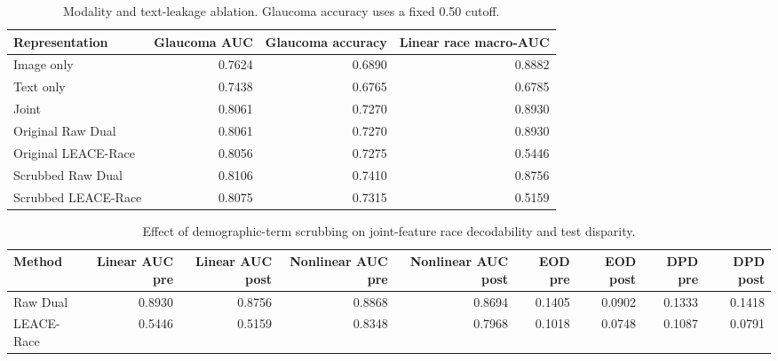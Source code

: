 \begin{table}[htbp]
\centering
\small
\caption{Modality and text-leakage ablation. Glaucoma accuracy uses a fixed 0.50 cutoff.}
\label{tab:text-modality-ablation}
\begin{tabular}{lrrr}
\toprule
Representation & Glaucoma AUC & Glaucoma accuracy & Linear race macro-AUC \\
\midrule
Image only & 0.7624 & 0.6890 & 0.8882 \\
Text only & 0.7438 & 0.6765 & 0.6785 \\
Joint & 0.8061 & 0.7270 & 0.8930 \\
Original Raw Dual & 0.8061 & 0.7270 & 0.8930 \\
Original LEACE-Race & 0.8056 & 0.7275 & 0.5446 \\
Scrubbed Raw Dual & 0.8106 & 0.7410 & 0.8756 \\
Scrubbed LEACE-Race & 0.8075 & 0.7315 & 0.5159 \\
\bottomrule
\end{tabular}
\end{table}

\begin{table}[htbp]
\centering
\small
\caption{Effect of demographic-term scrubbing on joint-feature race decodability and test disparity.}
\label{tab:text-scrubbing-effect}
\begin{tabular}{lrrrrrrrr}
\toprule
Method & Linear AUC pre & Linear AUC post & Nonlinear AUC pre & Nonlinear AUC post & EOD pre & EOD post & DPD pre & DPD post \\
\midrule
Raw Dual & 0.8930 & 0.8756 & 0.8868 & 0.8694 & 0.1405 & 0.0902 & 0.1333 & 0.1418 \\
LEACE-Race & 0.5446 & 0.5159 & 0.8348 & 0.7968 & 0.1018 & 0.0748 & 0.1087 & 0.0791 \\
\bottomrule
\end{tabular}
\end{table}
